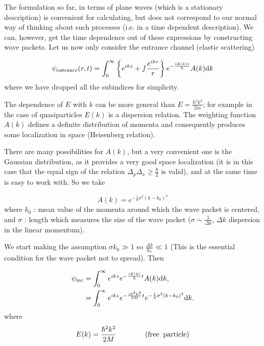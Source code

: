 The formulation so far, in terms of plane waves (which is a stationary description) is convenient for calculating, but does not correspond to our normal way of thinking about such processes (i.e. in a time dependent description). We can, however, get the time dependence out of these expressions by constructing wave packets. Let us now only consider the entrance channel (elastic scattering)

\begin{equation}\label{eq2nd_1}
\psi_{\rm entrance}(r,t) = \int_0^{\infty} \left\{ e^{ikz} + f \frac{e^{ikr}}{r} \right\} e^{-\frac{i E(k) t}{\hbar}} A(k) {\rm d}k
\end{equation}
where we have dropped all the subindices for simplicity.

The dependence of $E$ with $k$ can be more general than $E=\frac{\hbar^2 k^2}{2m}$; for example in the case of quasiparticles $E(k)$ is a dispersion relation. The weighting function $A(k)$ defines a definite distribution of momenta and consequently produces some localization in space (Heisenberg relation).

There are many possibilities for $A(k)$, but a very convenient one is the Gaussian distribution, as it provides a very good space localization (it is in this case that the equal sign of the relation $\Delta_p \Delta_x \ge \frac{\hbar}{2}$ is valid), and at the same time is easy to work with. So we take

\begin{equation}
A(k) = e^{-\frac{1}{4} \sigma^2 (k-k_0)^2}
\end{equation}
where $k_0$ : mean value of the momenta around which the wave packet is centered, and
$\sigma$ : length which measures the size of the wave packet ($\sigma \sim \frac{1}{\Delta k}$, $\Delta k$ dispersion in the linear momentum).

We start making the assumption $\sigma k_0 \gg 1$ so $\frac{\Delta k}{k_0} \ll 1$ (This is the essential condition for the wave packet not to spread). Then

\begin{equation}\label{eq_sa1}
\begin{split}
\psi_{\rm inc} &= \int_0^{\infty} e^{ikz} e^{-\frac{iE(k)}{\hbar}t} A(k) {\rm d}k, \\
&= \int_0^{\infty} e^{ikz} e^{-\frac{i \hbar^2 k^2}{2M}t} e^{-\frac{1}{4}\sigma^2 (k-k_0)^2} {\rm d}k.\\
\end{split}
\end{equation}
where
\begin{equation}
E(k) = \frac{\hbar^2 k^2}{2M} \qquad \qquad ({\rm free \;\; particle})
\end{equation}

